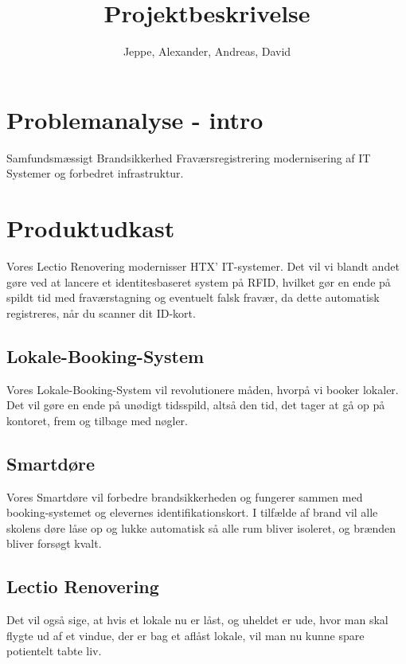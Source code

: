 \documentclass[12pt, a4paper]{article}
\title{Projektbeskrivelse}
\author{Jeppe, Alexander, Andreas, David}
\date{}
\begin{document}
\maketitle
\section{Problemanalyse - intro}
    Samfundsmæssigt
    Brandsikkerhed
    Fraværsregistrering 
    modernisering af IT Systemer og forbedret infrastruktur.

\section{Produktudkast}
    Vores Lectio Renovering modernisser HTX' IT-systemer. Det vil vi blandt andet gøre ved at lancere et identitesbaseret system på RFID, hvilket gør en ende på spildt tid med fraværstagning og eventuelt falsk fravær, da dette automatisk registreres, når du scanner dit ID-kort. 
\subsection{Lokale-Booking-System}
    Vores Lokale-Booking-System vil revolutionere måden, hvorpå vi booker lokaler. 
    Det vil gøre en ende på unødigt tidsspild, altså den tid, det tager at gå op på kontoret, frem og tilbage med nøgler.
\subsection{Smartdøre}
    Vores Smartdøre vil forbedre brandsikkerheden og fungerer sammen med booking-systemet og elevernes identifikationskort.
    I tilfælde af brand vil alle skolens døre låse op og lukke automatisk så alle rum bliver isoleret, og brænden bliver forsøgt kvalt. 
\subsection{Lectio Renovering}
    Det vil også sige, at hvis et lokale nu er låst, og uheldet er ude, hvor man skal flygte ud af et vindue, der er bag et aflåst lokale, vil man nu kunne spare potientelt tabte liv.
\end{document}
